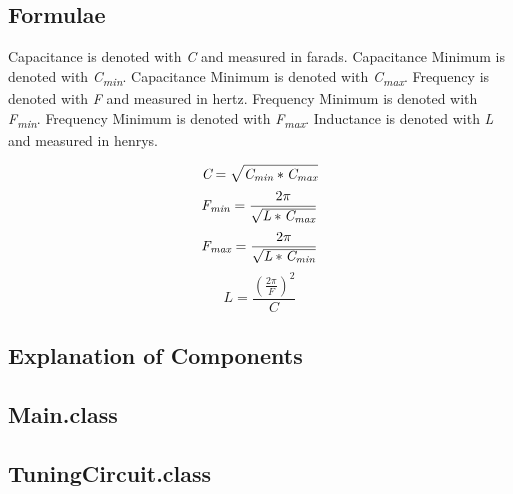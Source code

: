 \documentclass[12pt]{article}
\begin{document}
\newpage %



\begin{center}
\section{Formulae}
\end{center}
Capacitance is denoted with \textit{C} and measured in farads.
Capacitance Minimum is denoted with \textit{C\textsubscript{min}}.
Capacitance Minimum is denoted with \textit{C\textsubscript{max}}.
Frequency is denoted with \textit{F} and measured in hertz.
Frequency Minimum is denoted with \textit{F\textsubscript{min}}.
Frequency Minimum is denoted with \textit{F\textsubscript{max}}.
Inductance is denoted with \textit{L} and measured in henrys.
\par %
\begin{equation}
\textit{C} = \sqrt{\textit{C\textsubscript{min}}*\textit{C\textsubscript{max}}}
\end{equation}
\begin{equation}
\textit{F\textsubscript{min}} = \frac{2\pi}{\sqrt{\textit{L}*\textit{C\textsubscript{max}}}}
\end{equation}
\begin{equation}
\textit{F\textsubscript{max}} = \frac{2\pi}{\sqrt{\textit{L}*\textit{C\textsubscript{min}}}}
\end{equation}
\begin{equation}
\textit{L} = \frac{(\frac{2\pi}{\textit{F}})^2}{\textit{C}}
\end{equation}



\newpage %



\begin{center}
\section{Explanation of Components}
\end{center}
\subsection{Main.class}
\subsection{TuningCircuit.class}
\end{document}
